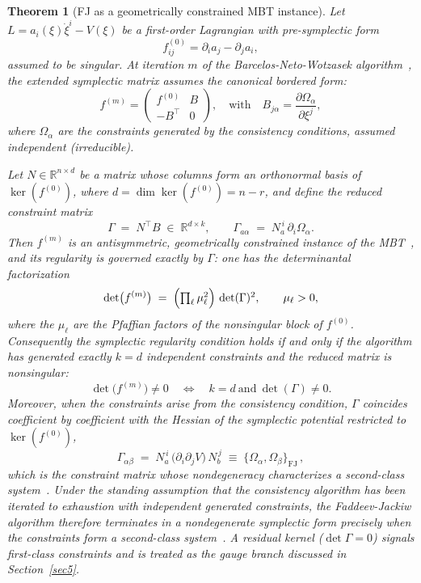 \documentclass[11pt,a4paper]{article}
\newtheorem{theorem}{Theorem}
\begin{document}
	\begin{theorem}[FJ as a geometrically constrained MBT instance]\label{theo1}
		Let $L = a_i(\xi)\dot{\xi}^i - V(\xi)$ be a first-order Lagrangian with pre-symplectic form
		\[
		f^{(0)}_{ij} = \partial_i a_j - \partial_j a_i,
		\]
		assumed to be singular. At iteration $m$ of the Barcelos-Neto-Wotzasek algorithm~\cite{BarcelosNetoWotzasek1992,BarcelosNetoWotzasek1993}, the extended symplectic matrix assumes the canonical bordered form:
		\[
		f^{(m)} =
		\begin{pmatrix}
			f^{(0)} & B \\
			- B^\top & 0
		\end{pmatrix},
		\quad
		\text{with} \quad B_{j\alpha} = \frac{\partial \Omega_\alpha}{\partial \xi^j},
		\]
		where $\Omega_\alpha$ are the constraints generated by the consistency conditions, assumed independent (irreducible).
		
		Let $N \in \mathbb{R}^{n\times d}$ be a matrix whose columns form an orthonormal basis of $\ker(f^{(0)})$, where $d = \dim\ker(f^{(0)}) = n - r$, and define the \emph{reduced constraint matrix}
		\[
		\Gamma \;=\; N^{\top} B \;\in\; \mathbb{R}^{d\times k},
		\qquad \Gamma_{a\alpha} \;=\; N_a^{\,i}\,\partial_i \Omega_\alpha .
		\]
		Then $f^{(m)}$ is an antisymmetric, geometrically constrained instance of the MBT~\cite{GolubVanLoan2013,StewartSun1990,Zhang2005}, and its regularity is governed exactly by $\Gamma$: one has the determinantal factorization
		\[
		\det\bigl(f^{(m)}\bigr) \;=\; \Bigl(\textstyle\prod_{\ell} \mu_\ell^{2}\Bigr)\,\det(\Gamma)^2 ,
		\qquad \mu_\ell > 0,
		\]
		where the $\mu_\ell$ are the Pfaffian factors of the nonsingular block of $f^{(0)}$. Consequently the symplectic regularity condition holds if and only if the algorithm has generated exactly $k=d$ independent constraints and the reduced matrix is nonsingular:
		\[
		\det \bigl(f^{(m)}\bigr) \neq 0
		\quad \Longleftrightarrow \quad
		k = d \ \text{and}\ \det(\Gamma) \neq 0 .
		\]
		Moreover, when the constraints arise from the consistency condition, $\Gamma$ coincides coefficient by coefficient with the Hessian of the symplectic potential restricted to $\ker(f^{(0)})$,
		\[
		\Gamma_{\alpha\beta} \;=\; N_a^{\,i}\,\bigl(\partial_i\partial_j V\bigr)\,N_b^{\,j} \;\equiv\; \{\Omega_\alpha, \Omega_\beta\}_{\mathrm{FJ}}\, ,
		\]
		which is the constraint matrix whose nondegeneracy characterizes a second-class system~\cite{Dirac1964,Henneaux1992}. Under the standing assumption that the consistency algorithm has been iterated to exhaustion with independent generated constraints, the Faddeev-Jackiw algorithm therefore terminates in a nondegenerate symplectic form precisely when the constraints form a second-class system~\cite{Dirac1964,GitmanTyutin1990}. A residual kernel ($\det\Gamma = 0$) signals first-class constraints and is treated as the gauge branch discussed in Section~\ref{sec5}.
	\end{theorem}
	
\end{document}
